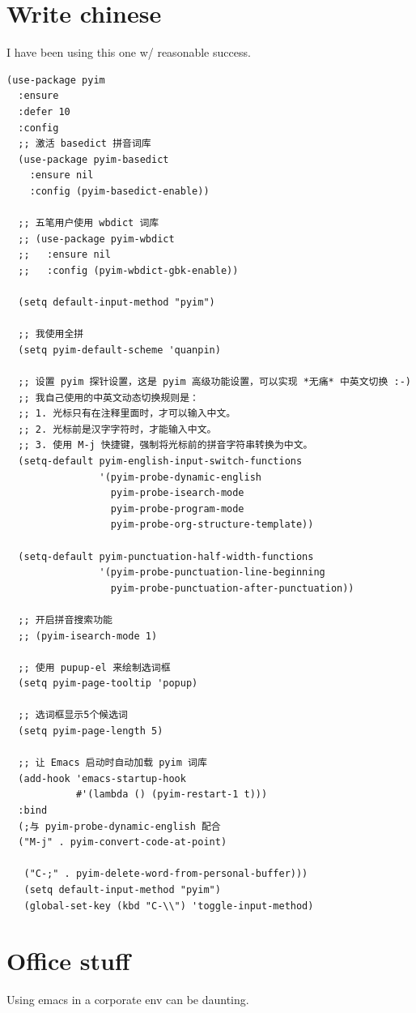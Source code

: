 \documentclass[11pt]{article}
\begin{document}
\section{Write chinese}
\label{sec:org140d6d4}
I have been using this one w/ reasonable success.
\begin{verbatim}
(use-package pyim
  :ensure
  :defer 10
  :config
  ;; 激活 basedict 拼音词库
  (use-package pyim-basedict
    :ensure nil
    :config (pyim-basedict-enable))

  ;; 五笔用户使用 wbdict 词库
  ;; (use-package pyim-wbdict
  ;;   :ensure nil
  ;;   :config (pyim-wbdict-gbk-enable))

  (setq default-input-method "pyim")

  ;; 我使用全拼
  (setq pyim-default-scheme 'quanpin)

  ;; 设置 pyim 探针设置，这是 pyim 高级功能设置，可以实现 *无痛* 中英文切换 :-)
  ;; 我自己使用的中英文动态切换规则是：
  ;; 1. 光标只有在注释里面时，才可以输入中文。
  ;; 2. 光标前是汉字字符时，才能输入中文。
  ;; 3. 使用 M-j 快捷键，强制将光标前的拼音字符串转换为中文。
  (setq-default pyim-english-input-switch-functions
                '(pyim-probe-dynamic-english
                  pyim-probe-isearch-mode
                  pyim-probe-program-mode
                  pyim-probe-org-structure-template))

  (setq-default pyim-punctuation-half-width-functions
                '(pyim-probe-punctuation-line-beginning
                  pyim-probe-punctuation-after-punctuation))

  ;; 开启拼音搜索功能
  ;; (pyim-isearch-mode 1)

  ;; 使用 pupup-el 来绘制选词框
  (setq pyim-page-tooltip 'popup)

  ;; 选词框显示5个候选词
  (setq pyim-page-length 5)

  ;; 让 Emacs 启动时自动加载 pyim 词库
  (add-hook 'emacs-startup-hook
            #'(lambda () (pyim-restart-1 t)))
  :bind
  (;与 pyim-probe-dynamic-english 配合
  ("M-j" . pyim-convert-code-at-point)

   ("C-;" . pyim-delete-word-from-personal-buffer)))
   (setq default-input-method "pyim")
   (global-set-key (kbd "C-\\") 'toggle-input-method)
\end{verbatim}
\section{Office stuff}
\label{sec:org1fdd010}
Using emacs in a corporate env can be daunting.
\end{document}
